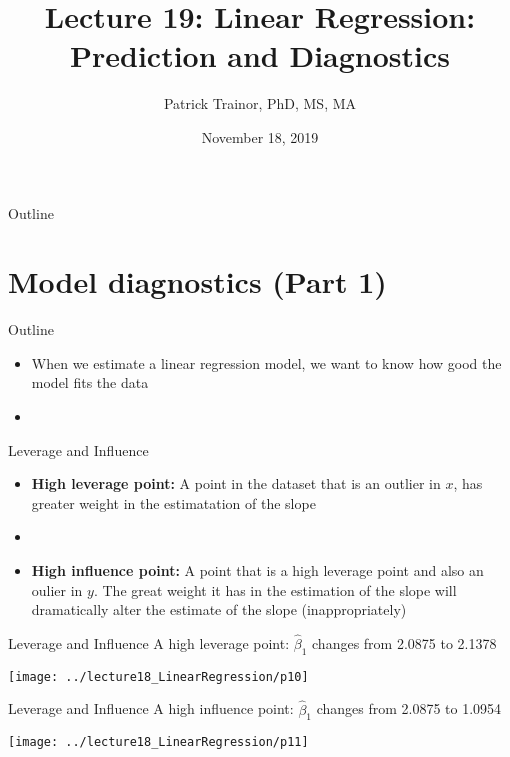 \documentclass[xcolor=dvipsnames]{beamer}
\title[Lecture 19]{Lecture 19: Linear Regression: Prediction and Diagnostics}
\author[Patrick Trainor]{Patrick Trainor, PhD, MS, MA}
\institute[NMSU]{New Mexico State University}
\date{November 18, 2019}
\begin{document}
\begin{frame}
\maketitle
\end{frame}

\begin{frame}{Outline}
\tableofcontents[hideallsubsections]
\end{frame}

\section{Model diagnostics (Part 1)}
\begin{frame}{Outline}
\tableofcontents[currentsection,subsectionstyle=show/shaded/hide]
\end{frame}

\begin{frame}
	\begin{itemize}
		\item When we estimate a linear regression model, we want to know how good the model fits the data
		\item[]
	\end{itemize}
\end{frame}

\begin{frame}{Leverage and Influence}
	\begin{itemize}
		\item \textbf{High leverage point:} A point in the dataset that is an outlier in $x$, has greater weight in the estimatation of the slope
		\item[]
		\item \textbf{High influence point:} A point that is a high leverage point and also an oulier in $y$. The great weight it has in the estimation of the slope will dramatically alter the estimate of the slope (inappropriately)
	\end{itemize}
\end{frame}

\begin{frame}{Leverage and Influence}
A high leverage point: $\hat{\beta}_1$ changes from 2.0875 to 2.1378
	\begin{center}
		\texttt{[image: ../lecture18\_LinearRegression/p10]}
	\end{center}
\end{frame}

\begin{frame}{Leverage and Influence}
A high influence point: $\hat{\beta}_1$ changes from 2.0875 to 1.0954
\begin{center}
	\texttt{[image: ../lecture18\_LinearRegression/p11]}
\end{center}
\end{frame}
\end{document}
